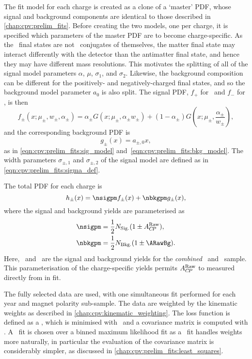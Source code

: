 The fit model for each charge is created as a clone of a `master' \ac{PDF}, 
whose signal and background components are identical to those described in 
\cref{chap:cpv:prelim_fits}.
Before creating the two models, one per charge, it is specified which 
parameters of the master \ac{PDF} are to become charge-specific.
As the \PLambdac\ final states are not \CP\ conjugates of themselves, the 
matter final state may interact differently with the detector than the 
antimatter final state, and hence they may have different mass resolutions.
This motivates the splitting of all of the signal model parameters $\alpha$, 
$\mu$, $\sigma_{1}$, and $\sigma_{2}$.
Likewise, the background composition can be different for the positively- and 
negatively-charged final states, and so the background model parameter $a_{0}$ 
is also split.
The signal \ac{PDF}, $f_{+}$ for \PLambdac\ and $f_{-}$ for \APLambdac, is then
\begin{equation}
  f_{\pm}(x; \mu_{\pm}, w_{\pm}, \alpha_{\pm}) =
    \alpha_{\pm}{}G(x; \mu_{\pm}, \alpha_{\pm}w_{\pm}) +
    (1 - \alpha_{\pm})G(x; \mu_{\pm}, \frac{\alpha_{\pm}}{w_{\pm}}),
\end{equation}
and the corresponding background \ac{PDF} is
\begin{equation}
  g_{\pm}(x) = a_{\pm,0}x,
\end{equation}
as in \cref{eqn:cpv:prelim_fits:sig_model} 
and~\cref{eqn:cpv:prelim_fits:bkg_model}.
The width parameters $\sigma_{\pm, 1}$ and  $\sigma_{\pm, 2}$ of the signal 
model are defined as in \cref{eqn:cpv:prelim_fits:sigma_def}.

The total \ac{PDF} for each charge is
\begin{equation}
  h_{\pm}(x) = \nsigpm f_{\pm}(x) + \nbkgpm g_{\pm}(x),
\end{equation}
where the signal and background yields are parameterised as
\begin{align}
  \nsigpm &= \frac{1}{2}\nsig(1 \pm \ARaw),\\
  \nbkgpm &= \frac{1}{2}\nbkg(1 \pm \ARawBg).
\end{align}
Here, \nsig\ and \nbkg\ are the signal and background yields for the 
\emph{combined} \PLambdac\ and \APLambdac\ sample.
This parameterisation of the charge-specific yields permits $A_{C\!P}^{\textnormal{Raw}}$ to measured 
directly from in fit.

The fully selected data are used, with one simultaneous fit performed for each 
year and magnet polarity sub-sample.
The data are weighted by the kinematic weights as described in 
\cref{chap:cpv:kinematic_weighting}.
The loss function is defined as a \chisq, which is minimised with \minuit\ and 
a covariance matrix is computed with \hesse.
A \chisq\ fit is chosen over a binned maximum likelihood fit as a \chisq\ fit 
handles weights more naturally, in particular the evaluation of the covariance 
matrix is considerably simpler, as discussed in 
\cref{chap:cpv:prelim_fits:least_squares}.

